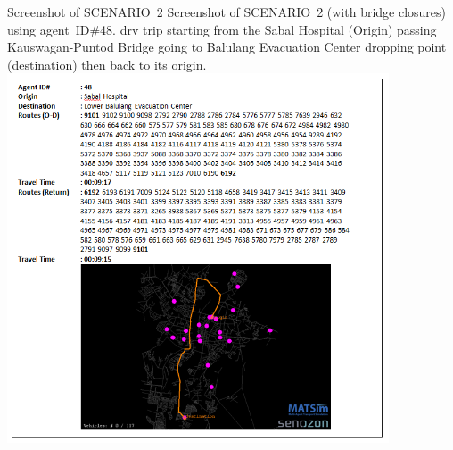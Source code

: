 \createfigure%
{Screenshot of SCENARIO~2}%
{Screenshot of SCENARIO~2 (with bridge closures) using agent~ID\#48. \protect\gls{drv} trip starting from the Sabal Hospital (Origin) passing Kauswagan-Puntod Bridge going to Balulang Evacuation Center dropping point (destination) then back to its origin.}%
{\label{fig:philippines_fig5}}%
{\includegraphics[width=0.85\textwidth, angle=0]{./using/figures/philippines_fig5.png}}%
{}







 
